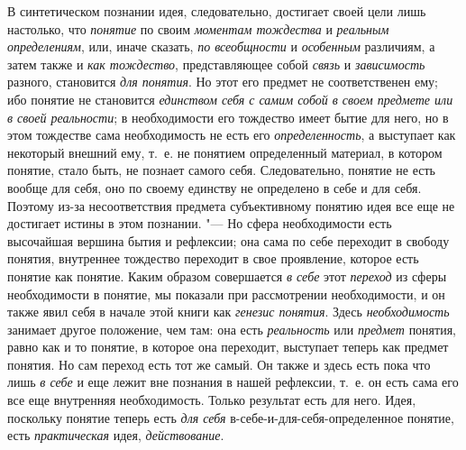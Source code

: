 В синтетическом познании идея, следовательно, достигает своей
цели лишь настолько, что {\em понятие}
по своим {\em моментам
тождества} и
{\em реальным определениям},
или, иначе сказать,
{\em по всеобщности} и
{\em особенным}
различиям, а затем также и
{\em как тождество},
представляющее собой
{\em связь} и
{\em зависимость}
разного, становится
{\em для понятия}. Но
этот его предмет не соответственен ему; ибо понятие не становится
{\em единством себя с самим собой в
своем предмете или в своей реальности}; в необходимости его
тождество имеет бытие для него, но в этом тождестве сама необходимость не
есть его {\em определенность},
а выступает как некоторый внешний ему, т.~е. не понятием
определенный материал, в котором понятие, стало быть, не познает самого
себя. Следовательно, понятие не есть вообще для себя, оно по своему
единству не определено в себе и для себя. Поэтому из-за несоответствия
предмета субъективному понятию идея все еще не достигает
истины в этом познании. "--- Но сфера необходимости есть
высочайшая вершина бытия и рефлексии; она сама по себе переходит в свободу
понятия, внутреннее тождество переходит в свое проявление, которое есть
понятие как понятие. Каким образом совершается
{\em в себе} этот
{\em переход} из сферы
необходимости в понятие, мы показали при рассмотрении необходимости, и он
также явил себя в начале этой книги как
{\em генезис понятия}.
Здесь {\em необходимость}
занимает другое положение, чем там: она есть
{\em реальность} или
{\em предмет} понятия,
равно как и то понятие, в которое она переходит, выступает теперь как
предмет понятия. Но сам переход есть тот же самый. Он также и здесь есть
пока что лишь {\em в себе}
и еще лежит вне познания в нашей рефлексии, т.~е. он есть
сама его все еще внутренняя необходимость. Только результат есть для него.
Идея, поскольку понятие теперь есть
{\em для себя}
в-себе-и-для-себя-определенное понятие, есть
{\em практическая} идея,
{\em действование}.

